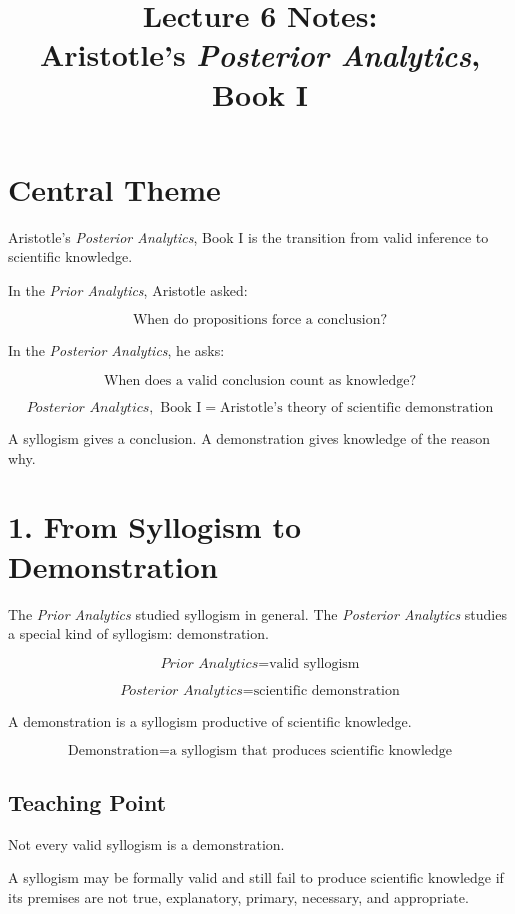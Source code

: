 \documentclass[12pt]{article}
\title{Lecture 6 Notes:\\ Aristotle's \textit{Posterior Analytics}, Book I}
\author{}
\date{}
\begin{document}
\maketitle

\section*{Central Theme}

Aristotle's \textit{Posterior Analytics}, Book I is the transition from valid
inference to scientific knowledge.

In the \textit{Prior Analytics}, Aristotle asked:

\[
\text{When do propositions force a conclusion?}
\]

In the \textit{Posterior Analytics}, he asks:

\[
\text{When does a valid conclusion count as knowledge?}
\]

\[
\boxed{
\textit{Posterior Analytics}, \text{ Book I}
=
\text{Aristotle's theory of scientific demonstration}
}
\]

A syllogism gives a conclusion. A demonstration gives knowledge of the reason
why.

\section*{1. From Syllogism to Demonstration}

The \textit{Prior Analytics} studied syllogism in general. The
\textit{Posterior Analytics} studies a special kind of syllogism:
demonstration.

\[
\textit{Prior Analytics} = \text{valid syllogism}
\]

\[
\textit{Posterior Analytics} = \text{scientific demonstration}
\]

A demonstration is a syllogism productive of scientific knowledge.

\[
\boxed{
\text{Demonstration} =
\text{a syllogism that produces scientific knowledge}
}
\]

\subsection*{Teaching Point}

Not every valid syllogism is a demonstration.

A syllogism may be formally valid and still fail to produce scientific
knowledge if its premises are not true, explanatory, primary, necessary, and
appropriate.
\end{document}
